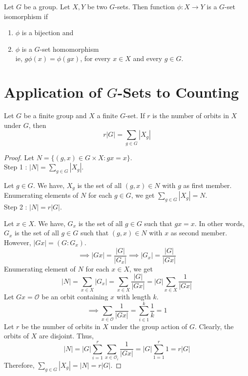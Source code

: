 \begin{definition}
	Let $G$ be a group. Let $X,Y$ be two $G$-sets. Then function $\phi : X \to Y$ is a $G$-set isomorphism if 
	\begin{enumerate}
		\item $\phi$ is a bijection and
		\item $\phi$ is a $G$-set homomorphism\\
		ie, $g\phi(x) = \phi(gx)$, for every $x \in X$ and every $g \in G$.
	\end{enumerate}
\end{definition}

\section{Application of $G$-Sets to Counting}
\begin{theorem}[Burnside]
	Let $G$ be a finite group and $X$ a finite $G$-set.
	If $r$ is the number of orbits in $X$ under $G$, then
	\begin{equation}
		r|G| = \sum_{g \in G}|X_g|
	\end{equation}
\end{theorem}
\begin{proof}
	Let $N = \{ (g,x) \in G \times X : gx = x \}$.\\
	Step 1 : $|N| = \sum\limits_{g \in G}|X_g|$.

	Let $g \in G$.
	We have, $X_g$ is the set of all $(g,x) \in N$ with $g$ as first member.
	Enumerating elements of $N$ for each $g \in G$, we get $\sum\limits_{g \in G}|X_g| = N$. \\
	Step 2 : $|N| = r|G|$.

	Let $x \in X$.
	We have, $G_x$ is the set of all $g \in G$ such that $gx = x$.
	In other words, $G_x$ is the set of all $g \in G$ such that $(g,x) \in N$ with $x$ as second member.
	However, $|Gx| = (G:G_x)$.
	$$\implies |Gx| = \frac{|G|}{|G_x|} \implies |G_x| = \frac{|G|}{|Gx|}$$
	Enumerating element of $N$ for each $x \in X$, we get
	$$|N| = \sum\limits_{x \in X} |G_x| = \sum\limits_{x \in X} \frac{|G|}{|Gx|} = |G| \sum\limits_{x \in X} \frac{1}{|Gx|}$$
	Let $Gx = \mathscr{O}$ be an orbit containing $x$ with length $k$.
	$$\implies \sum\limits_{x \in \mathscr{O}} \frac{1}{|Gx|} = \sum\limits_{i \in 1}^k \frac{1}{k} = 1$$
	Let $r$ be the number of orbits in $X$ under the group action of $G$.
	Clearly, the orbits of $X$ are disjoint. Thus,
	$$|N| = |G|\sum\limits_{i = 1}^r \sum\limits_{x \in \mathscr{O}_i} \frac{1}{|Gx|} = |G|\sum\limits_{1 = 1}^r 1 = r|G|$$
	Therefore, $\sum\limits_{g \in G} |X_g| = |N| = r|G|$.
\end{proof}

